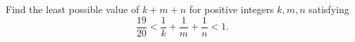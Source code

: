 Find the least possible value of $k+m+n$ for positive integers $k,m,n$ satisfying
\[\dfrac{19}{20}<\dfrac1k+\dfrac1m+\dfrac1n<1.\]
